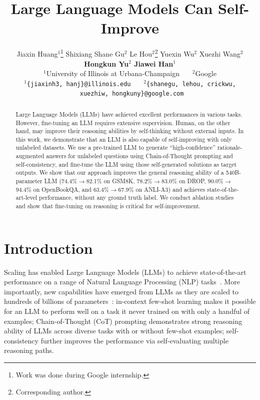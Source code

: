 \documentclass{article} %
\title{Large Language Models Can Self-Improve}
\author{Jiaxin Huang${}^1$\thanks{Work was done during Google internship.} \quad Shixiang Shane Gu${}^2$ \quad Le Hou${}^2$\thanks{Corresponding author.} \quad Yuexin Wu${}^2$ \quad Xuezhi Wang${}^2$ \quad \\ 
\textbf{Hongkun Yu${}^2$ \quad Jiawei Han${}^1$}\\
${}^1$University of Illinois at Urbana-Champaign \ \ \ ${}^2$Google \\
${}^1$\texttt{\{jiaxinh3, hanj\}@illinois.edu} \ \ \ ${}^2$\texttt{\{shanegu, lehou, crickwu,}\\\texttt{ xuezhiw, hongkuny\}@google.com}
}
\begin{document}
\maketitle


\begin{abstract}
Large Language Models (LLMs) have achieved excellent performances in various tasks. However, fine-tuning an LLM requires extensive supervision. Human, on the other hand, may improve their reasoning abilities by self-thinking without external inputs. In this work, we demonstrate that an LLM is also capable of self-improving with only unlabeled datasets.
We use a pre-trained LLM to generate ``high-confidence'' rationale-augmented answers for unlabeled questions using Chain-of-Thought prompting and self-consistency, and fine-tune the LLM using those self-generated solutions as target outputs. We show that our approach improves the general reasoning ability of a 540B-parameter LLM (74.4\%$\rightarrow$82.1\% on GSM8K, 78.2\%$\rightarrow$83.0\% on DROP, 90.0\%$\rightarrow$94.4\% on OpenBookQA, and 63.4\%$\rightarrow$67.9\% on ANLI-A3) and achieves state-of-the-art-level performance, without any ground truth label. We conduct ablation studies and show that fine-tuning on reasoning is critical for self-improvement.
\end{abstract}



\section{Introduction}

Scaling has enabled Large Language Models (LLMs) to achieve state-of-the-art performance on a range of Natural Language Processing (NLP) tasks~\citep{Wang2018GLUEAM, Wang2019SuperGLUEAS, Rajpurkar2016SQuAD1Q}. More importantly, new capabilities have emerged from LLMs as they are scaled to hundreds of billions of parameters~\citep{wei2022emergent}: in-context few-shot learning \citep{Brown2020LanguageMA} makes it possible for an LLM to perform well on a task it never trained on with only a handful of examples; Chain-of-Thought (CoT) prompting \citep{Wei2022ChainOT, step_by_step} demonstrates strong reasoning ability of LLMs across diverse tasks with or without few-shot examples; self-consistency \citep{Wang2022SelfConsistencyIC} further improves the performance via self-evaluating multiple reasoning paths.
\end{document}
